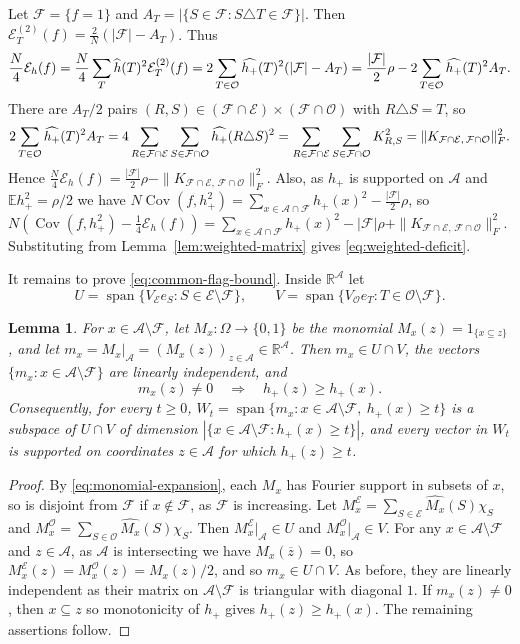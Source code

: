 \documentclass{article}
\theoremstyle{plain}
\newtheorem{lemma}[theo]{Lemma}
\theoremstyle{definition}
\newcommand{\mc}[1]{\mathcal{#1}}
\newcommand{\mb}[1]{\mathbb{#1}}
\newcommand{\sub}{\subseteq}
\newcommand{\sm}{\setminus}
\newcommand{\ov}{\overline}
\newcommand{\cE}{\mathcal E}
\newcommand{\OO}{\Omega}
\newcommand{\on}{\operatorname}
\begin{document}
Let $\mc{F}=\{f=1\}$ and $A_T=|\{S\in\mc F:S\triangle T\in\mc F\}|$. 
Then $\cE_T^{(2)}(f)=\frac{2}{N}(|\mc F|-A_T)$. Thus
\[
 \frac N4\mc E_h(f)
 =\frac N4\sum_T\widehat h(T)^2\cE_T^{(2)}(f)\\
 =2\sum_{T\in\mc O}\widehat{h_+}(T)^2(|\mc F|-A_T)\\
 =\frac{|\mc F|}{2}\rho
   -2\sum_{T\in\mc O}\widehat{h_+}(T)^2A_T.
\]
There are $A_T/2$ pairs $(R,S)\in(\mc F\cap\mc E)\times(\mc F\cap\mc O)$ with $R\triangle S=T$, so
\[
 2\sum_{T\in\mc O}\widehat{h_+}(T)^2A_T
 =4\sum_{R\in\mc F\cap\mc E}\sum_{S\in\mc F\cap\mc O}
     \widehat{h_+}(R\triangle S)^2\\
 =\sum_{R\in\mc F\cap\mc E}\sum_{S\in\mc F\cap\mc O}K_{R,S}^2
 =\|K_{\mc F\cap\mc E,\,\mc F\cap\mc O}\|_F^2.
\]
Hence
\(
 \frac N4\mc E_h(f)
 =\frac{|\mc F|}{2}\rho
 -\|K_{\mc F\cap\mc E,\,\mc F\cap\mc O}\|_F^2.
\)
Also, as $h_+$ is supported on $\mc A$ and $\mb E h_+^2=\rho/2$
we have $N\on{Cov}(f,h_+^2) = \sum_{x\in\mc A\cap\mc F}h_+(x)^2-\frac{|\mc F|}{2}\rho$,
so
\(
 N\left(\on{Cov}(f,h_+^2)-\frac14\mc E_h(f)\right)
 =\sum_{x\in\mc A\cap\mc F}h_+(x)^2
 -|\mc F|\rho
 +\|K_{\mc F\cap\mc E,\,\mc F\cap\mc O}\|_F^2.
\)
Substituting from Lemma~\ref{lem:weighted-matrix} gives \eqref{eq:weighted-deficit}.

It remains to prove \eqref{eq:common-flag-bound}. Inside $\mb R^{\mc A}$ let
\[
 U=\operatorname{span}\{V_{\mc E}e_S:S\in\mc E\sm\mc F\},\qquad
 V=\operatorname{span}\{V_{\mc O}e_T:T\in\mc O\sm\mc F\}.
\]

\begin{lemma}\label{lem:common-monomial-flag}
For $x\in\mc A\sm\mc F$, let $M_x:\OO\to\{0,1\}$ be the monomial
\(M_x(z)=1_{\{x\sub z\}}\), and let
\(m_x=M_x|_{\mc A}=(M_x(z))_{z\in\mc A}\in\mb R^{\mc A}\).
Then $m_x\in U\cap V$, the vectors $\{m_x:x\in\mc A\sm\mc F\}$ are linearly independent, and
\[
 m_x(z)\ne0\quad\Longrightarrow\quad h_+(z)\ge h_+(x).
\]
Consequently, for every $t\ge0$,
\(
 W_t=\operatorname{span}\{m_x:x\in\mc A\sm\mc F,\ h_+(x)\ge t\}
\)
is a subspace of $U\cap V$ of dimension
\(|\{x\in\mc A\sm\mc F:h_+(x)\ge t\}|\), and every vector in $W_t$ is supported on coordinates $z\in\mc A$ for which $h_+(z)\ge t$.
\end{lemma}

\begin{proof}
By \eqref{eq:monomial-expansion}, each $M_x$ has Fourier support in subsets of $x$,
so is disjoint from $\mc F$ if $x\notin\mc F$, as $\mc F$ is increasing. Let
\(M_x^{\mc E}=\sum_{S\in\mc E}\widehat{M_x}(S)\chi_S \) and
\(M_x^{\mc O}=\sum_{S\in\mc O}\widehat{M_x}(S)\chi_S\).
Then $M_x^{\mc E}|_{\mc A} \in U$ and  $M_x^{\mc O}|_{\mc A}\in V$.
For any $x\in\mc A\sm\mc F$ and $z\in\mc A$, as $\mc{A}$ is intersecting we have $M_x(\ov z)=0$, 
so $M_x^{\mc E}(z)=M_x^{\mc O}(z)=M_x(z)/2$, and so  $m_x\in U\cap V$. As before,
they are linearly independent as their matrix on $\mc A\sm\mc F$ is triangular with diagonal $1$.
If $m_x(z)\ne0$, then $x\sub z$ so monotonicity of $h_+$ gives $h_+(z)\ge h_+(x)$. 
The remaining assertions follow.
\end{proof}
\end{document}
